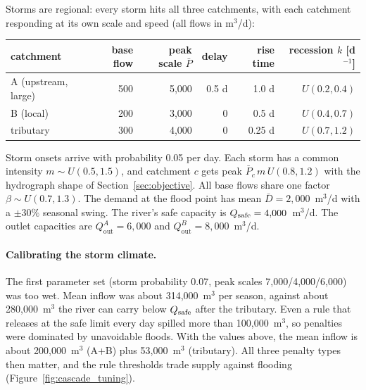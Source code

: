 Storms are regional: every storm hits all three catchments, with each
catchment responding at its own scale and speed (all flows in m$^3$/d):
\begin{center}
\small
\begin{tabular}{lrrrrr}
\toprule
catchment & base flow & peak scale $\bar P$ & delay & rise time & recession $k$ [d$^{-1}$] \\
\midrule
A (upstream, large) & 500 & 5{,}000 & 0.5 d & 1.0 d & $U(0.2,0.4)$\\
B (local) & 200 & 3{,}000 & 0 & 0.5 d & $U(0.4,0.7)$\\
tributary & 300 & 4{,}000 & 0 & 0.25 d & $U(0.7,1.2)$\\
\bottomrule
\end{tabular}
\end{center}
Storm onsets arrive with probability 0.05 per day. Each storm has a common
intensity $m\sim U(0.5,1.5)$, and catchment $c$ gets peak
$\bar P_c\,m\,U(0.8,1.2)$ with the hydrograph shape of
Section~\ref{sec:objective}. All base flows share one factor
$\beta\sim U(0.7,1.3)$. The demand at the flood point has mean
$\bar D=2{,}000$~m$^3$/d with a $\pm30\%$ seasonal swing. The river's safe
capacity is $Q_{\mathrm{safe}}=4{,}000$~m$^3$/d. The outlet capacities are
$Q^A_{\mathrm{out}}=6{,}000$ and $Q^B_{\mathrm{out}}=8{,}000$~m$^3$/d.

\paragraph{Calibrating the storm climate.} The first parameter set (storm
probability 0.07, peak scales 7{,}000/4{,}000/6{,}000) was too wet. Mean
inflow was about 314{,}000~m$^3$ per season, against about 280{,}000~m$^3$
the river can carry below $Q_{\mathrm{safe}}$ after the tributary. Even a rule that
releases at the safe limit every day spilled more than 100{,}000~m$^3$, so
penalties were dominated by unavoidable floods. With the values above, the
mean inflow is about 200{,}000~m$^3$ (A+B) plus 53{,}000~m$^3$ (tributary).
All three penalty types then matter, and the rule thresholds trade supply
against flooding (Figure~\ref{fig:cascade_tuning}).

